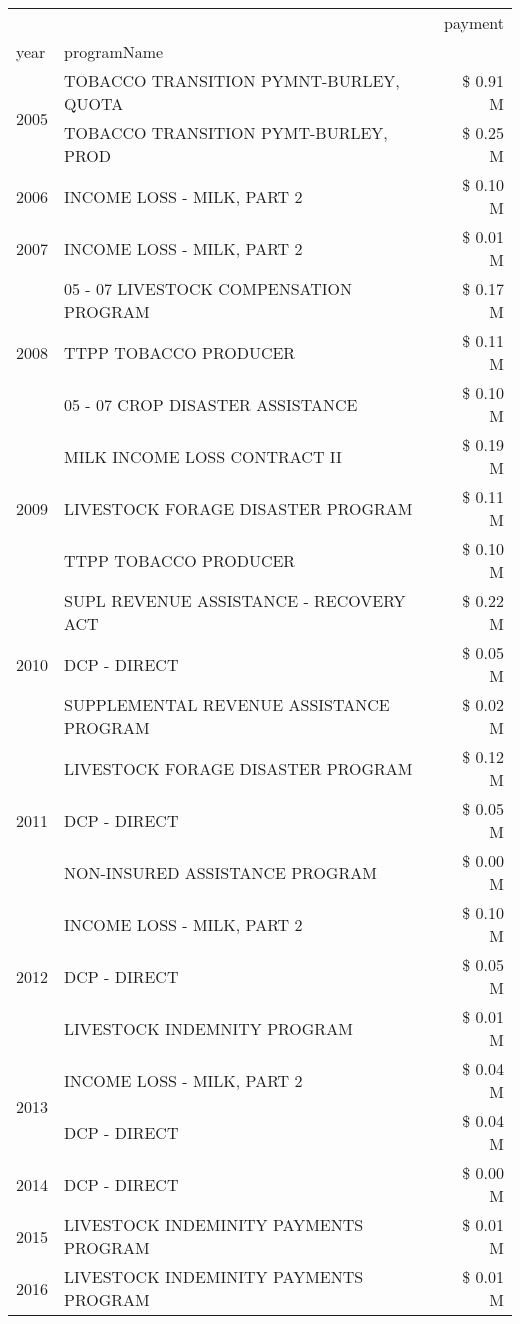 \begin{tabular}{llr}
\toprule
 &  & payment \\
year & programName &  \\
\midrule
\multirow[t]{2}{*}{2005} & TOBACCO TRANSITION PYMNT-BURLEY, QUOTA & \$ 0.91 M \\
 & TOBACCO TRANSITION PYMT-BURLEY, PROD & \$ 0.25 M \\
\cline{1-3}
2006 & INCOME LOSS - MILK, PART 2 & \$ 0.10 M \\
\cline{1-3}
2007 & INCOME LOSS - MILK, PART 2 & \$ 0.01 M \\
\cline{1-3}
\multirow[t]{3}{*}{2008} & 05 - 07 LIVESTOCK COMPENSATION PROGRAM & \$ 0.17 M \\
 & TTPP TOBACCO PRODUCER & \$ 0.11 M \\
 & 05 - 07 CROP DISASTER ASSISTANCE & \$ 0.10 M \\
\cline{1-3}
\multirow[t]{3}{*}{2009} & MILK INCOME LOSS CONTRACT II & \$ 0.19 M \\
 & LIVESTOCK FORAGE DISASTER  PROGRAM & \$ 0.11 M \\
 & TTPP TOBACCO PRODUCER & \$ 0.10 M \\
\cline{1-3}
\multirow[t]{3}{*}{2010} & SUPL REVENUE ASSISTANCE - RECOVERY ACT & \$ 0.22 M \\
 & DCP - DIRECT & \$ 0.05 M \\
 & SUPPLEMENTAL REVENUE ASSISTANCE PROGRAM & \$ 0.02 M \\
\cline{1-3}
\multirow[t]{3}{*}{2011} & LIVESTOCK FORAGE DISASTER PROGRAM & \$ 0.12 M \\
 & DCP - DIRECT & \$ 0.05 M \\
 & NON-INSURED ASSISTANCE PROGRAM & \$ 0.00 M \\
\cline{1-3}
\multirow[t]{3}{*}{2012} & INCOME LOSS - MILK, PART 2 & \$ 0.10 M \\
 & DCP - DIRECT & \$ 0.05 M \\
 & LIVESTOCK INDEMNITY PROGRAM & \$ 0.01 M \\
\cline{1-3}
\multirow[t]{2}{*}{2013} & INCOME LOSS - MILK, PART 2 & \$ 0.04 M \\
 & DCP - DIRECT & \$ 0.04 M \\
\cline{1-3}
2014 & DCP - DIRECT & \$ 0.00 M \\
\cline{1-3}
2015 & LIVESTOCK INDEMINITY PAYMENTS PROGRAM & \$ 0.01 M \\
\cline{1-3}
\multirow[t]{3}{*}{2016} & LIVESTOCK INDEMINITY PAYMENTS PROGRAM & \$ 0.01 M \\

\end{tabular}
